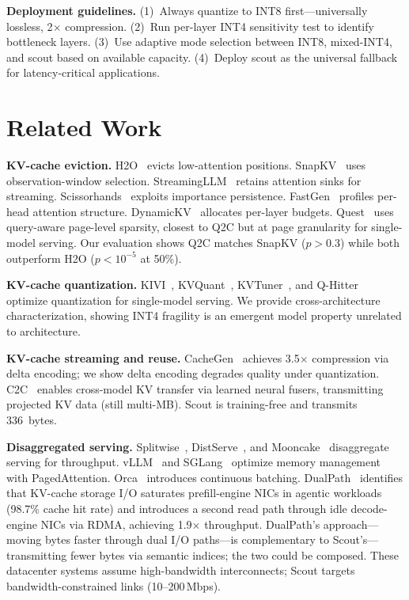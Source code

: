 \documentclass{article}
\newcommand{\QtoC}{\textsc{Q2C}\xspace}
\begin{document}
\textbf{Deployment guidelines.}
(1)~Always quantize to INT8 first---universally lossless, 2$\times$ compression.
(2)~Run per-layer INT4 sensitivity test to identify bottleneck layers.
(3)~Use adaptive mode selection between INT8, mixed-INT4, and scout based on available capacity.
(4)~Deploy scout as the universal fallback for latency-critical applications.


\section{Related Work}
\label{sec:related}

\textbf{KV-cache eviction.}
H2O~\citep{h2o} evicts low-attention positions.
SnapKV~\citep{snapkv} uses observation-window selection.
StreamingLLM~\citep{streamingllm} retains attention sinks for streaming.
Scissorhands~\citep{scissorhands} exploits importance persistence.
FastGen~\citep{fastgen} profiles per-head attention structure.
DynamicKV~\citep{dynamickv} allocates per-layer budgets.
Quest~\citep{quest} uses query-aware page-level sparsity, closest to \QtoC but at page granularity for single-model serving.
Our evaluation shows \QtoC matches SnapKV ($p > 0.3$) while both outperform H2O ($p < 10^{-5}$ at 50\%).

\textbf{KV-cache quantization.}
KIVI~\citep{kivi}, KVQuant~\citep{kvquant}, KVTuner~\citep{kvtuner}, and Q-Hitter~\citep{qhitter} optimize quantization for single-model serving.
We provide cross-architecture characterization, showing INT4 fragility is an emergent model property unrelated to architecture.

\textbf{KV-cache streaming and reuse.}
CacheGen~\citep{cachegen} achieves 3.5$\times$ compression via delta encoding; we show delta encoding degrades quality under quantization.
C2C~\citep{c2c} enables cross-model KV transfer via learned neural fusers, transmitting projected KV data (still multi-MB).
Scout is training-free and transmits 336~bytes.

\textbf{Disaggregated serving.}
Splitwise~\citep{splitwise}, DistServe~\citep{distserve}, and Mooncake~\citep{mooncake} disaggregate serving for throughput.
vLLM~\citep{vllm} and SGLang~\citep{sglang} optimize memory management with PagedAttention.
Orca~\citep{orca} introduces continuous batching.
DualPath~\citep{dualpath} identifies that KV-cache storage I/O saturates prefill-engine NICs in agentic workloads (98.7\% cache hit rate) and introduces a second read path through idle decode-engine NICs via RDMA, achieving 1.9$\times$ throughput.
DualPath's approach---moving bytes faster through dual I/O paths---is complementary to Scout's---transmitting fewer bytes via semantic indices; the two could be composed.
These datacenter systems assume high-bandwidth interconnects; Scout targets bandwidth-constrained links (10--200\,Mbps).
\end{document}
